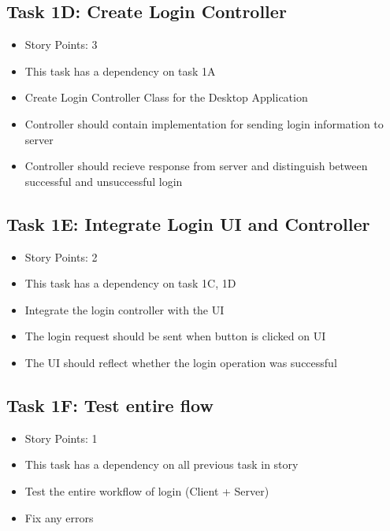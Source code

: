 \documentclass[12pt]{article}
\begin{document}
\subsection{Task 1D: Create Login Controller}
\begin{itemize}%
\item Story Points: 3
\item This task has a dependency on task 1A
\item Create Login Controller Class for the Desktop Application
\item Controller should contain implementation for sending login information to server
\item Controller should recieve response from server and distinguish between successful and unsuccessful login  
\end{itemize}

\subsection{Task 1E: Integrate Login UI and Controller}
\begin{itemize}%
\item Story Points: 2
\item This task has a dependency on task 1C, 1D
\item Integrate the login controller with the UI
\item The login request should be sent when button is clicked on UI
\item The UI should reflect whether the login operation was successful
\end{itemize}

\subsection{Task 1F: Test entire flow}
\begin{itemize}%
\item Story Points: 1
\item This task has a dependency on all previous task in story 
\item Test the entire workflow of login (Client + Server)
\item Fix any errors 
\end{itemize}

\newpage
\end{document}
